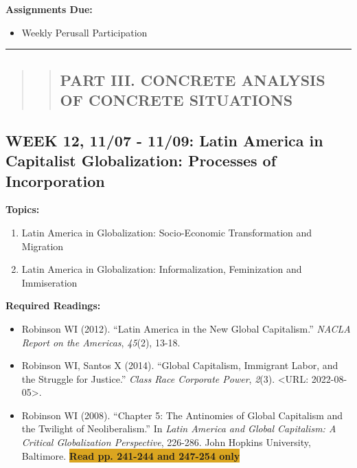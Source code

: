 \documentclass[11pt,]{article}
\providecommand{\tightlist}{%
  \setlength{\itemsep}{0pt}\setlength{\parskip}{0pt}}
\begin{document}
\textbf{Assignments Due:}

\begin{itemize}
\tightlist
\item
  Weekly Perusall Participation
\end{itemize}

\bigbreak
\hrule

\begin{quote}
\begin{quote}
\hypertarget{part-iii.-concrete-analysis-of-concrete-situations}{%
\subsection{PART III. CONCRETE ANALYSIS OF CONCRETE
SITUATIONS}\label{part-iii.-concrete-analysis-of-concrete-situations}}
\end{quote}
\end{quote}

\hypertarget{week-12-1107---1109-latin-america-in-capitalist-globalization-processes-of-incorporation}{%
\subsection{WEEK 12, 11/07 - 11/09: Latin America in Capitalist
Globalization: Processes of
Incorporation}\label{week-12-1107---1109-latin-america-in-capitalist-globalization-processes-of-incorporation}}

\textbf{Topics:}

\begin{enumerate}
\def\labelenumi{(\arabic{enumi})}
\tightlist
\item
  Latin America in Globalization: Socio-Economic Transformation and
  Migration
\item
  Latin America in Globalization: Informalization, Feminization and
  Immiseration
\end{enumerate}

\textbf{Required Readings:}

\begin{itemize}
\item
  Robinson WI (2012). ``Latin America in the New Global Capitalism.''
  \emph{NACLA Report on the Americas}, \emph{45}(2), 13-18.
\item
  Robinson WI, Santos X (2014). ``Global Capitalism, Immigrant Labor,
  and the Struggle for Justice.'' \emph{Class Race Corporate Power},
  \emph{2}(3). \textless URL: 2022-08-05\textgreater.
\item
  Robinson WI (2008). ``Chapter 5: The Antinomies of Global Capitalism
  and the Twilight of Neoliberalism.'' In \emph{Latin America and Global
  Capitalism: A Critical Globalization Perspective}, 226-286. John
  Hopkins University, Baltimore.
  \colorbox{Goldenrod}{\bf{Read pp. 241-244 and 247-254 only}}
\end{itemize}
\end{document}
